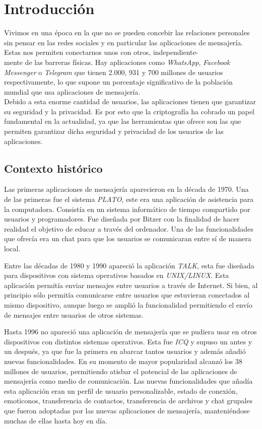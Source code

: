\chapter{Introducción}
Vivimos en una época en la que no se pueden concebir las relaciones personales sin pensar en las redes sociales y en particular las aplicaciones de mensajería. Estas nos permiten conectarnos unos con otros, independiente-\\mente de las barreras físicas.
Hay aplicaciones como  \emph{WhatsApp}, \emph{Facebook Messenger} o \emph{Telegram} que tienen 2.000, 931 y 700 millones de usuarios respectivamente, lo que supone un porcentaje significativo de la población mundial que usa aplicaciones de mensajería.\\  
Debido a esta enorme cantidad de usuarios, las aplicaciones tienen que garantizar su seguridad y la privacidad. Es por esto que la criptografía ha cobrado un papel fundamental en la actualidad, ya que las herramientas que ofrece son las que permiten garantizar dicha seguridad y privacidad de los usuarios de las aplicaciones.

\section{Contexto histórico}
Las primeras aplicaciones de mensajería aparecieron en la década de 1970. Una de las primeras fue el sistema \emph{PLATO}, este era una aplicación de asistencia para la computadora. Consistía en un sistema informático de tiempo compartido por usuarios y programadores. Fue diseñada por Bitzer con la finalidad de hacer realidad el objetivo de educar a través del ordenador. Una de las funcionalidades que ofrecía era un chat para que los usuarios se comunicaran entre sí de manera local.

Entre las décadas de 1980 y 1990 apareció la aplicación \emph{TALK}, esta fue diseñada para dispositivos con sistema operativos basados en \emph{UNIX/LINUX}. Esta aplicación permitía enviar mensajes entre usuarios a través de Internet. Si bien, al principio sólo permitía comunicarse entre usuarios que estuvieran conectados al mismo dispositivo, aunque luego se amplió la funcionalidad permitiendo el envío de mensajes entre usuarios de otros sistemas.

Hasta 1996 no apareció una aplicación de mensajería que se pudiera usar en otros dispositivos con distintos sistemas operativos. 
Esta fue \emph{ICQ} y supuso un antes y un después, ya que fue la primera en abarcar tantos usuarios y además añadió nuevas funcionalidades. En su momento de mayor popularidad alcanzó los 38 millones de usuarios, permitiendo atisbar el potencial de las aplicaciones de mensajería como medio de comunicación.
Las nuevas funcionalidades que añadía esta aplicación eran un perfil de usuario personalizable, estado de conexión, emoticonos, transferencia de contactos, transferencia de archivos y chat grupales que fueron adoptadas por las nuevas aplicaciones de mensajería, manteniéndose muchas de ellas hasta hoy en día.

